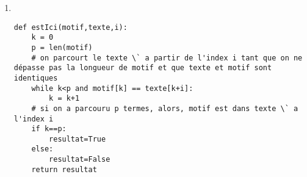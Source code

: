\begin{solution}
\begin{enumerate}
\item ~\\
\vspace{-0.7cm}
\begin{verbatim}
def estIci(motif,texte,i):
    k = 0
    p = len(motif)
    # on parcourt le texte \` a partir de l'index i tant que on ne dépasse pas la longueur de motif et que texte et motif sont identiques
    while k<p and motif[k] == texte[k+i]:
        k = k+1
    # si on a parcouru p termes, alors, motif est dans texte \` a l'index i
    if k==p:
        resultat=True
    else:
        resultat=False    	
    return resultat                
\end{verbatim}


\end{enumerate}
\end{solution}
